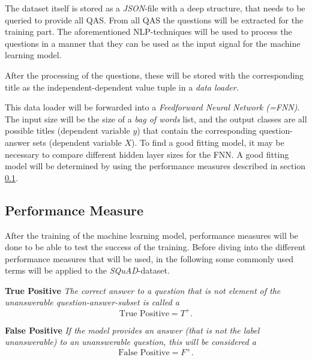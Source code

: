         The dataset itself is stored as a \emph{JSON}-file with a deep structure, that needs to be queried to provide all QAS.
        From all QAS the questions will be extracted for the training part.
        The aforementioned NLP-techniques will be used to process the questions in a manner that they can be used as the input signal for the machine learning model.

        After the processing of the questions, these will be stored with the corresponding title as the independent-dependent value tuple in a \emph{data loader}.

        This data loader will be forwarded into a \emph{Feedforward Neural Network (=FNN)}.
        The input size will be the size of a \emph{bag of words} list, and the output classes are all possible titles (dependent variable $y$) that contain the corresponding question-answer sets (dependent variable $X$). 
        To find a good fitting model, it may be necessary to compare different hidden layer sizes for the FNN.
        A good fitting model will be determined by using the performance measures described in section \ref{subsec:-the-learning-task---performance-measure}.


        
        
    \subsection{Performance Measure}
    \label{subsec:-the-learning-task---performance-measure}
    
        After the training of the machine learning model, performance measures will be done to be able to test the success of the training.
        Before diving into the different performance measures that will be used, in the following some commonly used terms will be applied to the \emph{SQuAD}-dataset.
        
        \begin{tcolorbox}
            \textbf{True Positive}
            \textit{The correct answer to a question that is not element of the unanswerable question-answer-subset is called a}
            $$\text{True Positive} = T^+.$$
        \end{tcolorbox}

        \begin{tcolorbox}
            \textbf{False Positive}
            \textit{If the model provides an answer (that is not the label unanswerable) to an unanswerable question, this will be considered a}
            $$\text{False Positive} = F^+.$$
        \end{tcolorbox}


